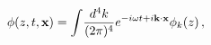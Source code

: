 \begin{equation}
\phi(z,t,{\bf x}) = \int \! {d^4 k\over (2\pi)^4 }
e^{-i\omega t + i {\bf k}\cdot{\bf x}}\phi_k(z)\,, 
\end{equation}

